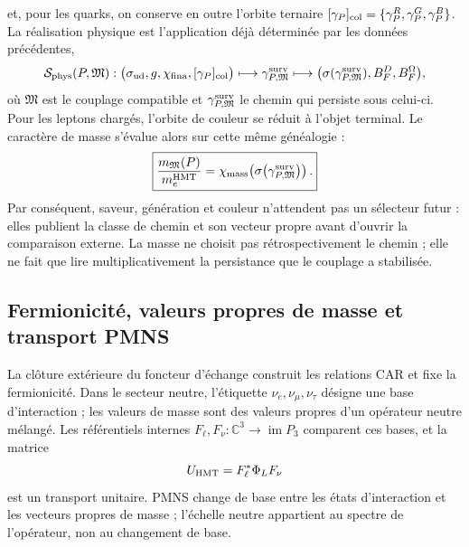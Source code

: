 et, pour les quarks, on conserve en outre l'orbite ternaire
\([\gamma_P]_{\rm col}=\{\gamma_P^R,\gamma_P^G,\gamma_P^B\}\). La réalisation
physique est l'application déjà déterminée par les données précédentes,
\begin{equation}
 \mathcal S_{\rm phys}(P,\mathfrak M):
 \bigl(\sigma_{\rm ud},g,\chi_{\rm fina},[\gamma_P]_{\rm col}\bigr)
 \longmapsto \gamma^{\rm surv}_{P,\mathfrak M}
 \longmapsto
 \bigl(\sigma(\gamma^{\rm surv}_{P,\mathfrak M}),
       B_F^D,B_F^\Omega\bigr),
 \label{eq:realizacion-fisica-sabor-ruta-cerrada-rev2}
\end{equation}
où \(\mathfrak M\) est le couplage compatible et
\(\gamma^{\rm surv}_{P,\mathfrak M}\) le chemin qui persiste sous celui-ci. Pour
les leptons chargés, l'orbite de couleur se réduit à l'objet terminal. Le caractère
de masse s'évalue alors sur cette même généalogie :
\begin{equation}
 \boxed{
 \frac{m_{\mathfrak M}(P)}{m_e^{\rm HMT}}
 =\chi_{\rm mass}\!\left(
   \sigma\!\left(\gamma^{\rm surv}_{P,\mathfrak M}\right)\right).}
 \label{eq:masa-como-caracter-persistencia-rev2}
\end{equation}
Par conséquent, saveur, génération et couleur n'attendent pas un sélecteur futur : elles publient la
classe de chemin et son vecteur propre avant d'ouvrir la comparaison externe. La masse ne
choisit pas rétrospectivement le chemin ; elle ne fait que lire multiplicativement la persistance
que le couplage a stabilisée.

\subsection{Fermionicité, valeurs propres de masse et transport PMNS}

La clôture extérieure du foncteur d'échange construit les relations CAR
et fixe la fermionicité. Dans le secteur neutre, l'étiquette
\(\nu_e,\nu_\mu,\nu_\tau\) désigne une base d'interaction ; les valeurs de
masse sont des valeurs propres d'un opérateur neutre mélangé. Les référentiels internes
\(F_\ell,F_\nu:\mathbb C^3\to\operatorname{im}P_3\) comparent ces bases, et
la matrice
\begin{equation}
 U_{\rm HMT}=F_\ell^*\Phi_LF_\nu
 \label{eq:transporte-pmns-generaciones-rev2}
\end{equation}
est un transport unitaire. PMNS change de base entre les états d'interaction
et les vecteurs propres de masse ; l'échelle neutre appartient au spectre de l'opérateur,
non au changement de base.


